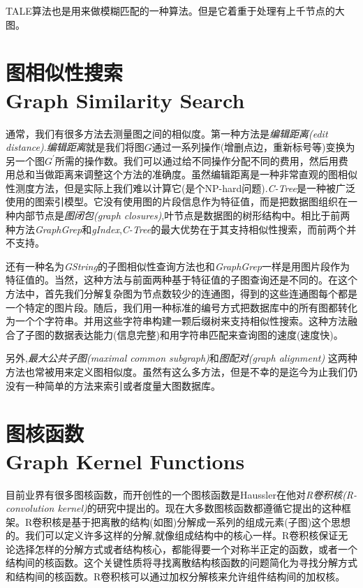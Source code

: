\documentclass{article}
\begin{document}
TALE算法也是用来做模糊匹配的一种算法。但是它着重于处理有上千节点的大图。


\section{图相似性搜索 \\ Graph Similarity Search}
通常，我们有很多方法去测量图之间的相似度。第一种方法是\emph{编辑距离(edit distance)}.\emph{编辑距离}就是我们将图$G$通过一系列操作(增删点边，重新标号等)变换为另一个图$G^{'}$所需的操作数。我们可以通过给不同操作分配不同的费用，然后用费用总和当做距离来调整这个方法的准确度。虽然编辑距离是一种非常直观的图相似性测度方法，但是实际上我们难以计算它(是个NP-hard问题).\emph{C-Tree}\cite{C-Tree}是一种被广泛使用的图索引模型。它没有使用图的片段信息作为特征值，而是把数据图组织在一种内部节点是\emph{图闭包(graph closures)},叶节点是数据图的树形结构中。相比于前两种方法\emph{GraphGrep}和\emph{gIndex},\emph{C-Tree}的最大优势在于其支持相似性搜索，而前两个并不支持。

还有一种名为\emph{GString}的子图相似性查询方法也和\emph{GraphGrep}一样是用图片段作为特征值的。当然，这种方法与前面两种基于特征值的子图查询还是不同的。在这个方法中，首先我们分解复杂图为节点数较少的连通图，得到的这些连通图每个都是一个特定的图片段。随后，我们用一种标准的编号方式把数据库中的所有图都转化为一个个字符串。并用这些字符串构建一颗后缀树来支持相似性搜索。这种方法融合了子图的数据表达能力(信息完整)和用字符串匹配来查询图的速度(速度快)。

另外,\emph{最大公共子图(maximal common subgraph)}\cite{mcs}和\emph{图配对(graph alignment)}\cite{assignment,assigment08} 这两种方法也常被用来定义图相似度。虽然有这么多方法，但是不幸的是迄今为止我们仍没有一种简单的方法来索引或者度量大图数据库。

\section{图核函数 \\ Graph Kernel Functions}
目前业界有很多图核函数，而开创性的一个图核函数是Haussler在他对\emph{R卷积核(R-convolution kernel)}的研究中提出的。现在大多数图核函数都遵循它提出的这种框架。R卷积核是基于把离散的结构(如图)分解成一系列的组成元素(子图)这个思想的。我们可以定义许多这样的分解,就像组成结构中的核心一样。R卷积核保证无论选择怎样的分解方式或者结构核心，都能得要一个对称半正定的函数，或者一个结构间的核函数。这个关键性质将寻找离散结构核函数的问题简化为寻找分解方式和结构间的核函数。R卷积核可以通过加权分解核来允许组件结构间的加权核。
\end{document}
